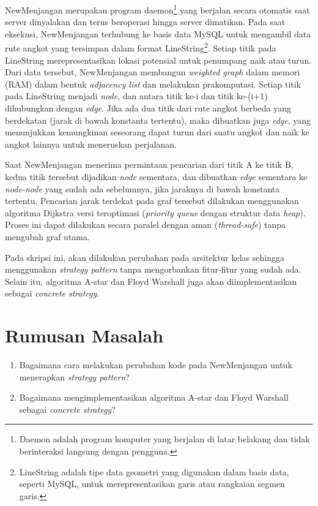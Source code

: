 \documentclass[a4paper,twoside]{article}
\begin{document}
 	NewMenjangan merupakan program daemon\footnote{Daemon adalah program komputer yang berjalan di latar belakang dan tidak berinteraksi langsung dengan pengguna.} yang berjalan secara otomatis saat server dinyalakan dan terus beroperasi hingga server dimatikan. Pada saat eksekusi, NewMenjangan terhubung ke basis data MySQL untuk mengambil data rute angkot yang tersimpan dalam format LineString\footnote{LineString adalah tipe data geometri yang digunakan dalam basis data, seperti MySQL, untuk merepresentasikan garis atau rangkaian segmen garis.}. Setiap titik pada LineString merepresentasikan lokasi potensial untuk penumpang naik atau turun. Dari data tersebut, NewMenjangan membangun \textit{weighted graph} dalam memori (RAM) dalam bentuk \textit{adjacency list} dan melakukan prakomputasi. Setiap titik pada LineString menjadi \textit{node}, dan antara titik ke-i dan titik ke-(i+1) dihubungkan dengan \textit{edge}. Jika ada dua titik dari rute angkot berbeda yang berdekatan (jarak di bawah konstanta tertentu), maka dibuatkan juga \textit{edge}, yang menunjukkan kemungkinan seseorang dapat turun dari suatu angkot dan naik ke angkot lainnya untuk meneruskan perjalanan. 
  
	Saat NewMenjangan menerima permintaan pencarian dari titik A ke titik B, kedua titik tersebut dijadikan \textit{node} sementara, dan dibuatkan \textit{edge} sementara ke \textit{node-node} yang sudah ada sebelumnya, jika jaraknya di bawah konstanta tertentu. Pencarian jarak terdekat pada graf tersebut dilakukan menggunakan algoritma Dijkstra versi teroptimasi (\textit{priority queue} dengan struktur data \textit{heap}). Proses ini dapat dilakukan secara paralel dengan aman (\textit{thread-safe}) tanpa mengubah graf utama.

	Pada skripsi ini, akan dilakukan perubahan pada arsitektur kelas sehingga menggunakan \textit{strategy pattern} tanpa mengorbankan fitur-fitur yang sudah ada. Selain itu, algoritma A-star dan Floyd Warshall juga akan diimplementasikan sebagai \textit{concrete strategy}.

    \newpage
	\section{Rumusan Masalah}
            \begin{enumerate}
                \item Bagaimana cara melakukan perubahan kode pada NewMenjangan untuk menerapkan \textit{strategy pattern}?
                \item Bagaimana mengimplementasikan algoritma A-star dan Floyd Warshall sebagai \textit{concrete strategy}?
            \end{enumerate}
	
\end{document}
